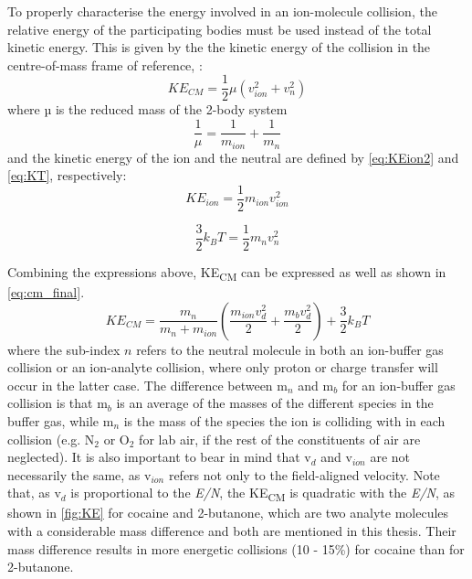 To properly characterise the energy involved in an ion-molecule collision, the relative energy of the participating bodies must be used instead of the total kinetic energy. This is given by the
the kinetic energy of the collision %
in the centre-of-mass frame of reference, %
\cite{mcfarland1973flow}:
\begin{equation}
\label{eq:cm}
KE_{CM} = \frac{1}{2}\mu (v_{ion}^2 + v_n^2)
\end{equation}
where µ is the reduced mass of the 2-body system %
\begin{equation}
\label{eq:reduced_mass}
\frac{1}{\mu} = \frac{1}{m_{ion}} + \frac{1}{m_{n}}
\end{equation}
and the kinetic energy of the ion and the neutral are defined by \autoref{eq:KEion2} and \autoref{eq:KT}, respectively:
\begin{equation}
\label{eq:KEion2}
KE_{ion} = \frac{1}{2}m_{ion}v_{ion}^2
\end{equation}

\begin{equation}
\label{eq:KT}
\frac{3}{2}k_B T = \frac{1}{2}m_{n}v_{n}^2
\end{equation}

Combining the expressions above, KE\textsubscript{CM} can be expressed as well as shown in \autoref{eq:cm_final}.
\begin{equation}
\label{eq:cm_final}
KE_{CM} = \frac{m_n}{m_n + m_{ion}} \left( \frac{m_{ion}v_d^2}{2} + \frac{m_{b}v_d^2}{2}\right) + \frac{3}{2}k_BT
\end{equation}
%
where the sub-index $n$ refers to the neutral molecule in both an ion-buffer gas collision or an ion-analyte collision, where only proton or charge transfer will occur in the latter case.
The difference between m$_n$ and m$_b$ for an ion-buffer gas collision is that m$_b$ is an average of the masses of the different species in the buffer gas, while m$_n$ is the mass of the species the ion is colliding with in each collision (e.g. N$_2$ or O$_2$ for lab air, if the rest of the constituents of air are neglected).
It is also important to bear in mind that v$_d$ and v$_{ion}$ are not necessarily the same, as v$_{ion}$ refers not only to the field-aligned velocity.
Note that, as v$_d$ is proportional to the \textit{E/N}, the KE\textsubscript{CM} is quadratic with the \textit{E/N}, as shown in \autoref{fig:KE} for cocaine and 2-butanone, which are two analyte molecules with a considerable mass difference and both are mentioned in this thesis. Their mass difference results in more energetic collisions (10 - 15\%) for cocaine than for 2-butanone.





